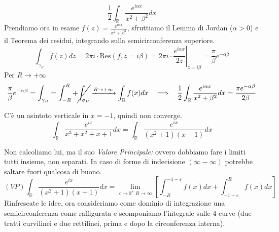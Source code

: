 \begin{equation*}
\frac{1}{2}\int _{\mathbb{R}}\frac{e^{i\alpha x}}{x^{2} +\beta ^{2}} dx
\end{equation*}Prendiamo ora in esame $f(z)=\frac{e^{i\alpha x}}{x^{2} +\beta ^{2}}$, sfruttiamo il Lemma di Jordan ($\alpha  >0$) e il Teorema dei residui, integrando sulla semicirconferenza superiore.
\begin{equation*}
\int _{\gamma _{R}} f( z) dz=2\pi i\cdotp \mathrm{Res}( f,z=i\beta ) =2\pi i\cdotp \left. \frac{e^{i\alpha x}}{2z}\right| _{z=i\beta } =\frac{\pi }{\beta } e^{-\alpha \beta }
\end{equation*}
Per $R\rightarrow +\infty $
\begin{equation*}
\frac{\pi }{\beta } e^{-\alpha \beta } =\int _{\gamma _{R}} =\int ^{R}_{-R} +\cancel{\int _{\sigma _{R}}}\xrightarrow{R\rightarrow +\infty }\int _{\mathbb{R}} f( x) dx\ \ \implies \ \ \frac{1}{2}\int _{\mathbb{R}}\frac{e^{i\alpha x}}{x^{2} +\beta ^{2}} dx=\frac{\pi e^{-\alpha \beta }}{2\beta }
\end{equation*}
\Soluzione

C'è un asintoto verticale in $x=-1$, quindi non converge.\begin{equation*}
\int _{\mathbb{R}}\frac{e^{ix}}{x^{3} +x^{2} +x+1} dx=\int _{\mathbb{R}}\frac{e^{ix}}{(x^{2} +1)(x+1)} dx
\end{equation*}

Non calcoliamo lui, ma il suo \textit{Valore Principale:} ovvero dobbiamo fare i limiti tutti insieme, non separati. In caso di forme di indecisione $( \infty -\infty )$ potrebbe saltare fuori qualcosa di buono.
\begin{equation*}
( VP)\int _{\mathbb{R}}\frac{e^{ix}}{(x^{2} +1)(x+1)} dx=\lim _{\varepsilon \rightarrow 0^{+} \ R\rightarrow \infty }\left[\int ^{-1-\varepsilon }_{-R} f(x)dx+\int ^{R}_{-1+\varepsilon } f(x)dx\right]
\end{equation*}
Rinfrescate le idee, ora consideriamo come dominio di integrazione una semicirconferenza come raffigurata e scomponiamo l'integrale sulle 4 curve (due tratti curvilinei e due rettilinei, prima e dopo la circonferenza interna).



